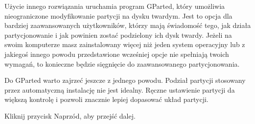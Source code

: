 \textcolor{ubuntu_orange}{Użycie innego rozwiązania} uruchamia program GParted, który umożliwia nieograniczone modyfikowanie partycji na dysku twardym. Jest to opcja dla bardziej zaawansowanych użytkowników, którzy mają świadomość tego, jak działa partycjonowanie i jak powinien zostać podzielony ich dysk twardy. Jeżeli na swoim komputerze masz zainstalowany więcej niż jeden system operacyjny lub z jakiegoś innego powodu przedstawione wcześniej opcje nie spełniają twoich wymagań, to konieczne będzie sięgnięcie do zaawansowanego partycjonowania.

Do GParted warto zajrzeć jeszcze z jednego powodu. Podział partycji stosowany przez automatyczną instalację nie jest idealny. Ręczne ustawienie partycji da większą kontrolę i pozwoli znacznie lepiej dopasować układ partycji.
\begin{flushright}
Kliknij przycisk \textcolor{ubuntu_orange}{Naprzód}, aby przejść dalej.
\end{flushright}

